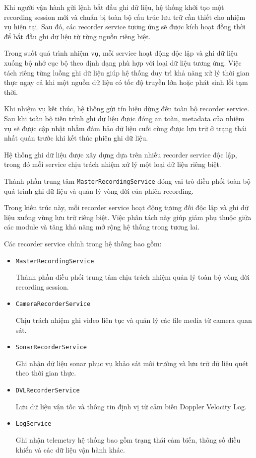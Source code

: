 \documentclass[../DoAn.tex]{subfiles}
\begin{document}
Khi người vận hành gửi lệnh bắt đầu ghi dữ liệu, hệ thống khởi tạo một recording session mới và chuẩn bị toàn bộ cấu trúc lưu trữ cần thiết cho nhiệm vụ hiện tại. Sau đó, các recorder service tương ứng sẽ được kích hoạt đồng thời để bắt đầu ghi dữ liệu từ từng nguồn riêng biệt.

Trong suốt quá trình nhiệm vụ, mỗi service hoạt động độc lập và ghi dữ liệu xuống bộ nhớ cục bộ theo định dạng phù hợp với loại dữ liệu tương ứng. Việc tách riêng từng luồng ghi dữ liệu giúp hệ thống duy trì khả năng xử lý thời gian thực ngay cả khi một nguồn dữ liệu có tốc độ truyền lớn hoặc phát sinh lỗi tạm thời.

Khi nhiệm vụ kết thúc, hệ thống gửi tín hiệu dừng đến toàn bộ recorder service. Sau khi toàn bộ tiến trình ghi dữ liệu được đóng an toàn, metadata của nhiệm vụ sẽ được cập nhật nhằm đảm bảo dữ liệu cuối cùng được lưu trữ ở trạng thái nhất quán trước khi kết thúc phiên ghi dữ liệu.

Hệ thống ghi dữ liệu được xây dựng dựa trên nhiều recorder service độc lập, trong đó mỗi service chịu trách nhiệm xử lý một loại dữ liệu riêng biệt.

Thành phần trung tâm \texttt{MasterRecordingService} đóng vai trò điều phối toàn bộ quá trình ghi dữ liệu và quản lý vòng đời của phiên recording.

Trong kiến trúc này, mỗi recorder service hoạt động tương đối độc lập và ghi dữ liệu xuống vùng lưu trữ riêng biệt. Việc phân tách này giúp giảm phụ thuộc giữa các module và tăng khả năng mở rộng hệ thống trong tương lai.

Các recorder service chính trong hệ thống bao gồm:

\begin{itemize}
    \item \texttt{MasterRecordingService}
    
    Thành phần điều phối trung tâm chịu trách nhiệm quản lý toàn bộ vòng đời recording session.

    \item \texttt{CameraRecorderService}
    
    Chịu trách nhiệm ghi video liên tục và quản lý các file media từ camera quan sát.

    \item \texttt{SonarRecorderService}
    
    Ghi nhận dữ liệu sonar phục vụ khảo sát môi trường và lưu trữ dữ liệu quét theo thời gian thực.

    \item \texttt{DVLRecorderService}
    
    Lưu dữ liệu vận tốc và thông tin định vị từ cảm biến Doppler Velocity Log.

    \item \texttt{LogService}
    
    Ghi nhận telemetry hệ thống bao gồm trạng thái cảm biến, thông số điều khiển và các dữ liệu vận hành khác.
\end{itemize}
\end{document}
